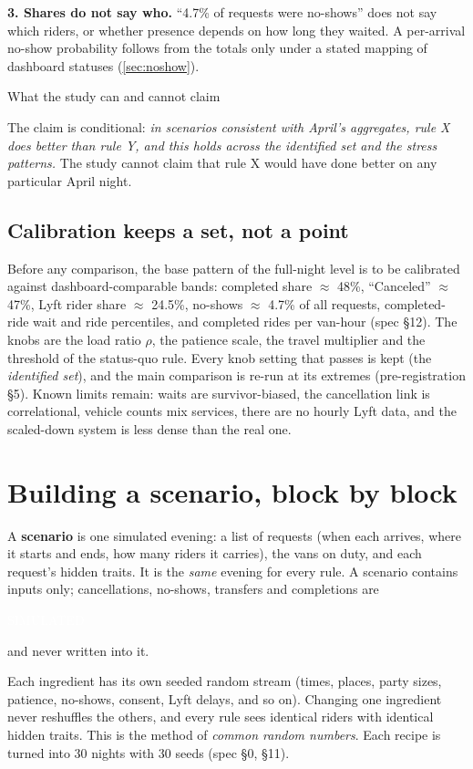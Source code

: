\documentclass[11pt,letterpaper]{article}
\newcommand{\marker}[2]{{\setlength{\fboxsep}{1.4pt}\colorbox{#1}{\textcolor{white}{\sffamily\bfseries\scriptsize\strut #2}}}}
\newcommand{\Simulated}{\marker{cSim}{SIMULATED}}
\newenvironment{callout}[1][]{%
  \def\FrameCommand{\fboxsep=8pt\colorbox{shade}}%
  \MakeFramed{\advance\hsize-\width\FrameRestore}%
  \ifx\relax#1\relax\else{\sffamily\bfseries\color{heading}#1}\par\smallskip\fi}%
  {\endMakeFramed}
\begin{document}
\textbf{3. Shares do not say who.} ``4.7\% of requests were no-shows'' does not say which riders, or whether presence depends on how long they waited. A per-arrival no-show probability follows from the totals only under a stated mapping of dashboard statuses (\cref{sec:noshow}).

\begin{callout}[What the study can and cannot claim]
The claim is conditional: \emph{in scenarios consistent with April's aggregates, rule X does better than rule Y, and this holds across the identified set and the stress patterns.} The study cannot claim that rule X would have done better on any particular April night.
\end{callout}

\subsection{Calibration keeps a set, not a point}
Before any comparison, the base pattern of the full-night level is to be calibrated against dashboard-comparable bands: completed share $\approx$ 48\%, ``Canceled'' $\approx$ 47\%, Lyft rider share $\approx$ 24.5\%, no-shows $\approx$ 4.7\% of all requests, completed-ride wait and ride percentiles, and completed rides per van-hour (spec §12). The knobs are the load ratio $\rho$, the patience scale, the travel multiplier and the threshold of the status-quo rule. Every knob setting that passes is kept (the \emph{identified set}), and the main comparison is re-run at its extremes (pre-registration §5). Known limits remain: waits are survivor-biased, the cancellation link is correlational, vehicle counts mix services, there are no hourly Lyft data, and the scaled-down system is less dense than the real one.

\section{Building a scenario, block by block}\label{sec:blocks}

A \textbf{scenario} is one simulated evening: a list of requests (when each arrives, where it starts and ends, how many riders it carries), the vans on duty, and each request's hidden traits. It is the \emph{same} evening for every rule. A scenario contains inputs only; cancellations, no-shows, transfers and completions are \Simulated{} and never written into it.

Each ingredient has its own seeded random stream (times, places, party sizes, patience, no-shows, consent, Lyft delays, and so on). Changing one ingredient never reshuffles the others, and every rule sees identical riders with identical hidden traits. This is the method of \emph{common random numbers}. Each recipe is turned into 30 nights with 30 seeds (spec §0, §11).
\end{document}
